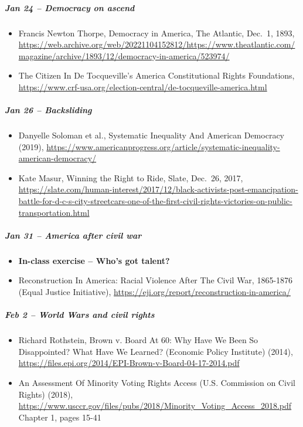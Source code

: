 \documentclass[
]{article}
\providecommand{\tightlist}{%
  \setlength{\itemsep}{0pt}\setlength{\parskip}{0pt}}
\begin{document}
\hypertarget{jan-24-democracy-on-ascend}{%
\subparagraph{Jan 24 -- Democracy on
ascend}\label{jan-24-democracy-on-ascend}}

\begin{itemize}
\tightlist
\item
  Francis Newton Thorpe, Democracy in America, The Atlantic, Dec.~1,
  1893,
  \url{https://web.archive.org/web/20221104152812/https://www.theatlantic.com/magazine/archive/1893/12/democracy-in-america/523974/}
\item
  The Citizen In De Tocqueville's America Constitutional Rights
  Foundations,
  \url{https://www.crf-usa.org/election-central/de-tocqueville-america.html}
\end{itemize}

\hypertarget{jan-26-backsliding}{%
\subparagraph{Jan 26 -- Backsliding}\label{jan-26-backsliding}}

\begin{itemize}
\tightlist
\item
  Danyelle Soloman et al., Systematic Inequality And American Democracy
  (2019),
  \url{https://www.americanprogress.org/article/systematic-inequality-american-democracy/}
\item
  Kate Masur, Winning the Right to Ride, Slate, Dec.~26, 2017,
  \url{https://slate.com/human-interest/2017/12/black-activists-post-emancipation-battle-for-d-c-s-city-streetcars-one-of-the-first-civil-rights-victories-on-public-transportation.html}
\end{itemize}

\hypertarget{jan-31-america-after-civil-war}{%
\subparagraph{Jan 31 -- America after civil
war}\label{jan-31-america-after-civil-war}}

\begin{itemize}
\tightlist
\item
  \textbf{In-class exercise -- Who's got talent?}
\item
  Reconstruction In America: Racial Violence After The Civil War,
  1865-1876 (Equal Justice Initiative),
  \url{https://eji.org/report/reconstruction-in-america/}
\end{itemize}

\hypertarget{feb-2-world-wars-and-civil-rights}{%
\subparagraph{Feb 2 -- World Wars and civil
rights}\label{feb-2-world-wars-and-civil-rights}}

\begin{itemize}
\tightlist
\item
  Richard Rothstein, Brown v. Board At 60: Why Have We Been So
  Disappointed? What Have We Learned? (Economic Policy Institute)
  (2014),
  \url{https://files.epi.org/2014/EPI-Brown-v-Board-04-17-2014.pdf}
\item
  An Assessment Of Minority Voting Rights Access (U.S. Commission on
  Civil Rights) (2018),
  \url{https://www.usccr.gov/files/pubs/2018/Minority_Voting_Access_2018.pdf}
  Chapter 1, pages 15-41
\end{itemize}
\end{document}
